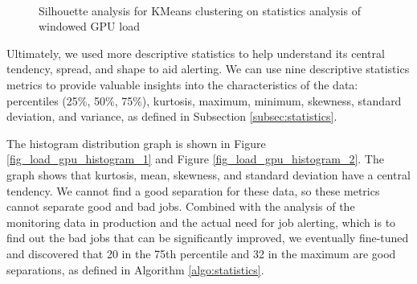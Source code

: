 \begin{figure}[H]
{    }\\
    \caption{Silhouette analysis for KMeans clustering on statistics analysis of windowed GPU load}
    \label{fig_silhouette_statistics}
\end{figure}

Ultimately, we used more descriptive statistics to help understand its central tendency, spread, and shape to aid alerting. We can use nine descriptive statistics metrics to provide valuable insights into the characteristics of the data: percentiles (25\%, 50\%, 75\%), kurtosis, maximum, minimum, skewness, standard deviation, and variance, as defined in Subsection \ref{subsec:statistics}.

The histogram distribution graph is shown in Figure \ref{fig_load_gpu_histogram_1} and Figure \ref{fig_load_gpu_histogram_2}. The graph shows that kurtosis, mean, skewness, and standard deviation have a central tendency. We cannot find a good separation for these data, so these metrics cannot separate good and bad jobs. Combined with the analysis of the monitoring data in production and the actual need for job alerting, which is to find out the bad jobs that can be significantly improved, we eventually fine-tuned and discovered that 20 in the 75th percentile and 32 in the maximum are good separations, as defined in Algorithm \ref{algo:statistics}.

